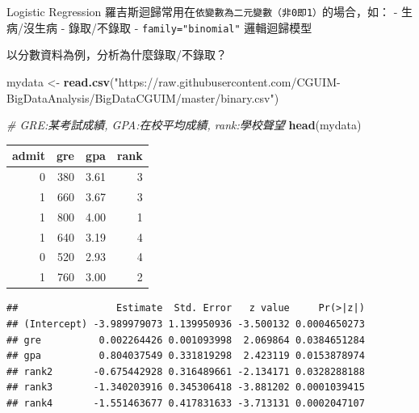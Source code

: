 \documentclass[
]{book}
\newenvironment{Shaded}{\begin{snugshade}}{\end{snugshade}}
\newcommand{\CommentTok}[1]{\textcolor[rgb]{0.56,0.35,0.01}{\textit{#1}}}
\newcommand{\DataTypeTok}[1]{\textcolor[rgb]{0.13,0.29,0.53}{#1}}
\newcommand{\KeywordTok}[1]{\textcolor[rgb]{0.13,0.29,0.53}{\textbf{#1}}}
\newcommand{\NormalTok}[1]{#1}
\newcommand{\OperatorTok}[1]{\textcolor[rgb]{0.81,0.36,0.00}{\textbf{#1}}}
\newcommand{\StringTok}[1]{\textcolor[rgb]{0.31,0.60,0.02}{#1}}
\begin{document}
Logistic Regression 羅吉斯迴歸常用在\texttt{依變數為二元變數（非0即1）}的場合，如：
- 生病/沒生病
- 錄取/不錄取
- \texttt{family="binomial"} 邏輯迴歸模型

以分數資料為例，分析為什麼錄取/不錄取？

\begin{Shaded}
\begin{Highlighting}[]
\NormalTok{mydata <-}\StringTok{ }\KeywordTok{read.csv}\NormalTok{(}\StringTok{"https://raw.githubusercontent.com/CGUIM-BigDataAnalysis/BigDataCGUIM/master/binary.csv"}\NormalTok{)}
\end{Highlighting}
\end{Shaded}

\begin{Shaded}
\begin{Highlighting}[]
\CommentTok{# GRE:某考試成績, GPA:在校平均成績, rank:學校聲望}
\KeywordTok{head}\NormalTok{(mydata)}
\end{Highlighting}
\end{Shaded}

\begin{tabular}{r|r|r|r}
\hline
admit & gre & gpa & rank\\
\hline
0 & 380 & 3.61 & 3\\
\hline
1 & 660 & 3.67 & 3\\
\hline
1 & 800 & 4.00 & 1\\
\hline
1 & 640 & 3.19 & 4\\
\hline
0 & 520 & 2.93 & 4\\
\hline
1 & 760 & 3.00 & 2\\
\hline
\end{tabular}

\begin{Shaded}
\end{Shaded}

\begin{verbatim}
##                 Estimate  Std. Error   z value     Pr(>|z|)
## (Intercept) -3.989979073 1.139950936 -3.500132 0.0004650273
## gre          0.002264426 0.001093998  2.069864 0.0384651284
## gpa          0.804037549 0.331819298  2.423119 0.0153878974
## rank2       -0.675442928 0.316489661 -2.134171 0.0328288188
## rank3       -1.340203916 0.345306418 -3.881202 0.0001039415
## rank4       -1.551463677 0.417831633 -3.713131 0.0002047107
\end{verbatim}
\end{document}
